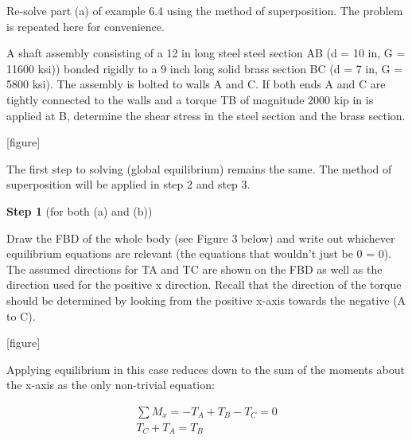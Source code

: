 \documentclass[
  letterpaper,
  DIV=11,
  numbers=noendperiod]{scrreprt}
\begin{document}
\begin{tcolorbox}[enhanced jigsaw, breakable, opacityback=0, toptitle=1mm, left=2mm, colback=white, opacitybacktitle=0.6, colframe=quarto-callout-note-color-frame, titlerule=0mm, arc=.35mm, leftrule=.75mm, bottomtitle=1mm, colbacktitle=quarto-callout-note-color!10!white, rightrule=.15mm, title={Example 6.5: Needs title}, bottomrule=.15mm, toprule=.15mm, coltitle=black]

Re-solve part (a) of example 6.4 using the method of superposition. The
problem is repeated here for convenience.

A shaft assembly consisting of a 12 in long steel steel section AB (d =
10 in, G = 11600 ksi)) bonded rigidly to a 9 inch long solid brass
section BC (d = 7 in, G = 5800 ksi). The assembly is bolted to walls A
and C. If both ends A and C are tightly connected to the walls and a
torque TB of magnitude 2000 kip in is applied at B, determine the shear
stress in the steel section and the brass section.

{[}figure{]}

\begin{tcolorbox}[enhanced jigsaw, breakable, opacityback=0, toptitle=1mm, left=2mm, colback=white, opacitybacktitle=0.6, colframe=quarto-callout-note-color-frame, titlerule=0mm, arc=.35mm, leftrule=.75mm, bottomtitle=1mm, colbacktitle=quarto-callout-note-color!10!white, rightrule=.15mm, title={Solution}, bottomrule=.15mm, toprule=.15mm, coltitle=black]

The first step to solving (global equilibrium) remains the same. The
method of superposition will be applied in step 2 and step 3.

\textbf{Step 1} (for both (a) and (b))

Draw the FBD of the whole body (see Figure 3 below) and write out
whichever equilibrium equations are relevant (the equations that
wouldn't just be 0 = 0). The assumed directions for TA and TC are shown
on the FBD as well as the direction used for the positive x direction.
Recall that the direction of the torque should be determined by looking
from the positive x-axis towards the negative (A to C).

{[}figure{]}

Applying equilibrium in this case reduces down to the sum of the moments
about the x-axis as the only non-trivial equation:

\[
\begin{gathered}
\sum M_x=-T_A+T_B-T_C=0 \\
T_C+T_A=T_B
\end{gathered}
\]


\end{tcolorbox}
\end{tcolorbox}
\end{document}
